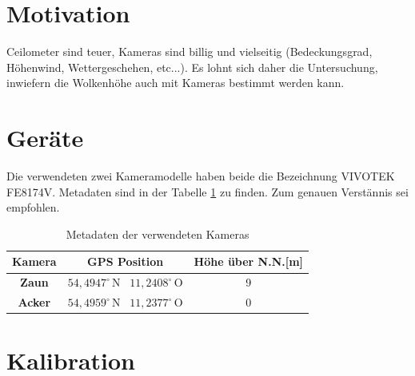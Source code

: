\documentclass[a4paper,11pt,twoside,german]{article}
\newcommand{\absatz}{\smallbreak} %
\begin{document}
\listoffigures %

\newpage


\section{Motivation}

Ceilometer sind teuer, Kameras sind billig und vielseitig (Bedeckungsgrad,
Höhenwind, Wettergeschehen, etc...).  Es lohnt sich daher die Untersuchung,
inwiefern die Wolkenhöhe auch mit Kameras bestimmt werden kann.
\absatz
\blindtext[1]


\section{Geräte}

Die verwendeten zwei Kameramodelle haben beide die Bezeichnung VIVOTEK FE8174V.
Metadaten sind in der Tabelle \ref{TabelleKameraMeta} zu finden.
Zum genauen Verstännis sei \cite{abook} empfohlen.
\absatz

\begin{table}[!h]
\begin{center}
\caption{Metadaten der verwendeten Kameras}
\label{TabelleKameraMeta}
\absatz
\begin{tabular}{|c|c|c|}
\hline
\textbf{Kamera} & \textbf{GPS Position} & \textbf{Höhe über N.N.[m]} \\\hline
\textbf{Zaun}   & $54,4947^\circ\,\mathrm{N}$ \, $11,2408^\circ\,\mathrm{O}$ &
9                \\\hline
\textbf{Acker}   & $54,4959^\circ\,\mathrm{N}$ \, $11,2377^\circ\,\mathrm{O}$ &
0                \\\hline
\end{tabular}
\vspace{-0.5cm}
\end{center}
\end{table}

\blindtext


\section{Kalibration}
\end{document}
